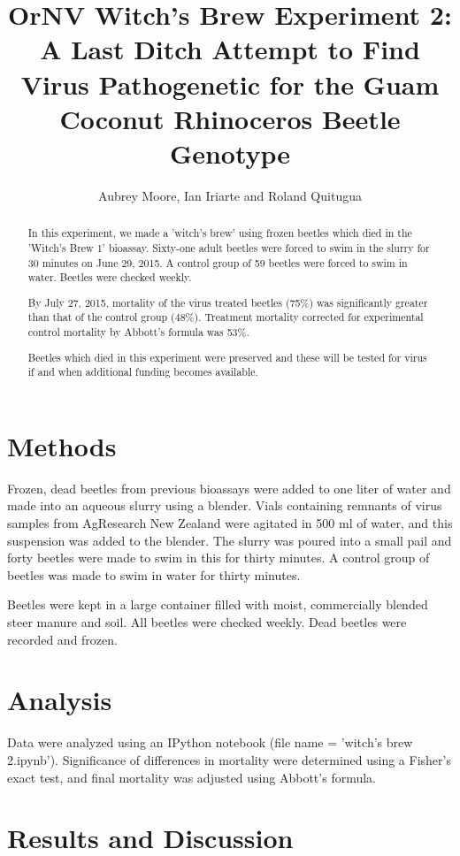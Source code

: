 \documentclass[letterpaper,11pt]{scrartcl}
\title{OrNV Witch's Brew Experiment 2: A Last Ditch Attempt to Find Virus Pathogenetic for the Guam Coconut
Rhinoceros Beetle Genotype}
\author{Aubrey Moore, Ian Iriarte and Roland Quitugua}
\begin{document}
\maketitle

\begin{abstract}
In this experiment, we made a 'witch's brew' using frozen beetles which died in the 'Witch's Brew 1' bioassay. 
Sixty-one adult beetles were forced to swim in the slurry for 30 minutes on June 29, 2015. A control group of
59 beetles were forced to swim in water. Beetles were checked weekly.

By July 27, 2015, mortality of the virus treated beetles (75\%) was significantly greater than that of the
control group (48\%). Treatment mortality corrected for experimental control mortality by Abbott's 
formula was 53\%.

Beetles which died in this experiment were preserved and these will be tested for virus if and when additional funding becomes available.
\end{abstract}

\section*{Methods}

Frozen, dead beetles from previous bioassays were added to one liter of water and made into an aqueous slurry
using a blender. Vials containing remnants of virus samples from AgResearch New Zealand were agitated in 500 ml of 
water, and this suspension was added to the blender. The slurry was poured into a small pail and
forty beetles were made to swim in this for thirty minutes. A control group of beetles was made to swim in water for 
thirty minutes.

Beetles were kept in a large container filled with moist, commercially blended steer manure and soil. 
All beetles were checked weekly. Dead beetles were recorded and frozen.

\section*{Analysis}

Data were analyzed using an IPython notebook (file name = 'witch's brew 2.ipynb'). Significance of differences in mortality
were determined using a Fisher's exact test, and final mortality was adjusted using Abbott's formula.

\section*{Results and Discussion}
\end{document}
